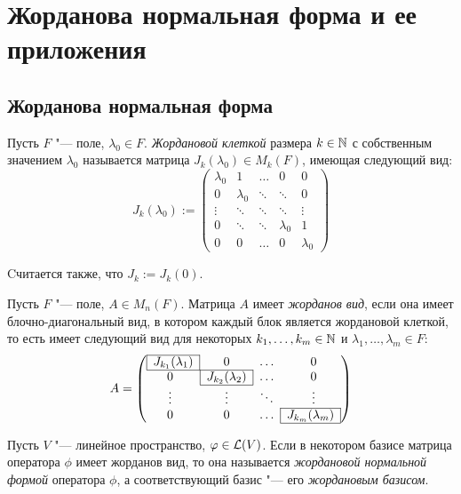 \section{Жорданова нормальная форма и ее приложения}

\subsection{Жорданова нормальная форма}

\begin{definition}
	Пусть $F$ "--- поле, $\lambda_0 \in F$. \textit{Жордановой клеткой} размера $k \in \mathbb{N}$ с собственным значением $\lambda_0$ называется матрица $J_k(\lambda_0) \in M_k(F)$, имеющая следующий вид:
	\[J_k(\lambda_0) := \begin{pmatrix}
		\lambda_0 & 1 & \dots & 0 & 0 \\ 
		0 & \lambda_0 & \ddots & \ddots & 0 \\ 
		\vdots & \ddots & \ddots & \ddots & \vdots \\ 
		0 & \ddots & \ddots & \lambda_0 & 1 \\ 
		0 & 0 & \dots & 0 & \lambda_0
	\end{pmatrix}\]
	
	Cчитается также, что $J_k := J_k(0)$.
\end{definition}

\begin{definition}
	Пусть $F$ "--- поле, $A \in M_n(F)$. Матрица $A$ имеет \textit{жорданов вид}, если она имеет блочно-диагональный вид, в котором каждый блок является жордановой клеткой, то есть имеет следующий вид для некоторых $k_1, \dotsc, k_m \in \mathbb{N}$ и $\lambda_1, \dotsc, \lambda_m \in F$:
	\[A = \left(\begin{array}{@{}cccc@{}}
		\cline{1-1}
		\multicolumn{1}{|c|}{J_{k_1}(\lambda_1)} & 0 & \dots & 0\\
		\cline{1-2}
		0 & \multicolumn{1}{|c|}{J_{k_2}(\lambda_2)} & \dots & 0\\
		\cline{2-2}
		\vdots & \vdots & \ddots & \vdots\\
		\cline{4-4}
		0 & 0 & \dots & \multicolumn{1}{|c|}{J_{k_m}(\lambda_m)}\\
		\cline{4-4}
	\end{array}\right)\]
\end{definition}

\begin{definition}
	Пусть $V$ "--- линейное пространство, $\varphi \in \mathcal L(V)$. Если в некотором базисе матрица оператора $\phi$ имеет жорданов вид, то она называется \textit{жордановой нормальной формой} оператора $\phi$, а соответствующий базис "--- его \textit{жордановым базисом}.
\end{definition}

